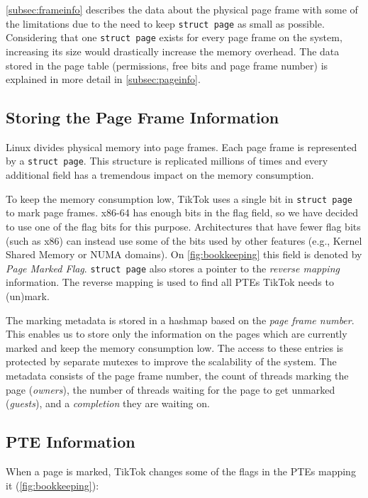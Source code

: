 \documentclass[conference]{IEEEtran}
\newcommand{\sysname}{TikTok}
\begin{document}
\autoref{subsec:frameinfo} describes the data about the physical page frame with
some of the limitations due to the need to keep \texttt{struct page} as small as
possible. Considering that one \texttt{struct page} exists for every page frame
on the system, increasing its size would drastically increase the memory
overhead.  The data stored in the page table (permissions, free bits and page
frame number) is explained in more detail in \autoref{subsec:pageinfo}.

\subsection{Storing the Page Frame Information}
\label{subsec:frameinfo}
Linux divides physical memory into page frames. Each page frame is represented
by a \texttt{struct page}. This structure is replicated millions of times and
every additional field has a tremendous impact on the memory consumption.

To keep the memory consumption low, \sysname{} uses a single bit in \texttt{struct
page} to mark page frames. x86-64 has enough bits in the flag
field, so we have decided to use one of the flag bits for this purpose.
Architectures that have fewer flag bits (such as x86) can instead use some of
the bits used by other features (e.g., Kernel Shared Memory or NUMA domains). On
\autoref{fig:bookkeeping} this field is denoted by \emph{Page Marked Flag}.
\texttt{struct page} also stores a pointer to the \emph{reverse mapping}
information. The reverse mapping is used to find all PTEs \sysname{} needs to
(un)mark.

The marking metadata is stored in a hashmap based on the \emph{page frame
number}. This enables us to store only the information on the pages which are
currently marked and keep the memory consumption low. The access to these entries
is protected by separate mutexes to improve the scalability of the system. The
metadata consists of the page frame number, the count of threads marking the page
(\emph{owners}), the number of threads waiting for the page to get unmarked
(\emph{guests}), and a \emph{completion} they are waiting on. 

\subsection{PTE Information}
\label{subsec:pageinfo}

When a page is marked, \sysname{} changes some of the flags in the PTEs mapping it
(\autoref{fig:bookkeeping}):
\end{document}
